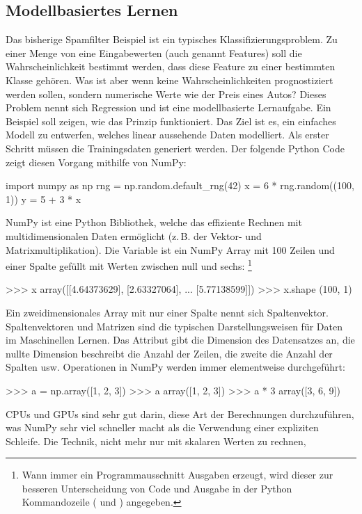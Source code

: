 \subsection{Modellbasiertes Lernen}
Das bisherige Spamfilter Beispiel ist ein typisches
Klassifizierungsproblem. Zu einer Menge von eine Eingabewerten
(auch genannt Features) soll die Wahrscheinlichkeit bestimmt werden,
dass diese Feature zu einer bestimmten Klasse gehören.
Was ist aber wenn keine Wahrscheinlichkeiten
prognostiziert werden sollen, sondern numerische Werte wie
der Preis eines Autos? Dieses Problem nennt sich Regression und
ist eine modellbasierte Lernaufgabe.
Ein Beispiel soll zeigen, wie das Prinzip funktioniert.
Das Ziel ist es, ein einfaches Modell zu entwerfen,
welches linear aussehende Daten modelliert.
Als erster Schritt müssen die Trainingsdaten generiert werden.
Der folgende Python Code zeigt diesen Vorgang mithilfe von NumPy:
\begin{pythoncode}
import numpy as np
rng = np.random.default_rng(42)
x = 6 * rng.random((100, 1))
y = 5 + 3 * x
\end{pythoncode}
NumPy ist eine Python Bibliothek, welche das effiziente Rechnen mit
multidimensionalen Daten ermöglicht (z.\,B. der Vektor- und Matrixmultiplikation).
Die Variable  ist ein NumPy Array mit 100 Zeilen und einer Spalte
gefüllt mit Werten zwischen null und sechs: \footnote{
  Wann immer ein Programmausschnitt Ausgaben erzeugt, wird
  dieser zur besseren Unterscheidung von Code und Ausgabe in der Python Kommandozeile
  (\pythoninline{>>>} und ) angegeben.
}
\begin{pyconcode}
>>> x
array([[4.64373629],
       [2.63327064],
       ...
       [5.77138599]])
>>> x.shape
(100, 1)
\end{pyconcode}
Ein zweidimensionales Array mit nur einer Spalte nennt sich Spaltenvektor.
Spaltenvektoren und Matrizen sind die typischen Darstellungsweisen
für Daten im Maschinellen Lernen.
Das Attribut  gibt die Dimension des Datensatzes an, die nullte
Dimension beschreibt die Anzahl der Zeilen, die zweite die Anzahl der Spalten usw.
Operationen in NumPy werden immer elementweise durchgeführt:
\begin{pyconcode}
>>> a = np.array([1, 2, 3])
>>> a
array([1, 2, 3])
>>> a * 3
array([3, 6, 9])
\end{pyconcode}
CPUs und GPUs sind sehr gut darin, diese Art der Berechnungen durchzuführen,
was NumPy sehr viel schneller macht als die Verwendung einer expliziten Schleife.
Die Technik, nicht mehr nur mit skalaren Werten zu rechnen,
